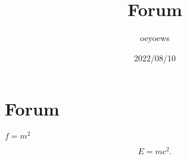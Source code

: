 \documentclass{article}
\title{Forum}
\author{oeyoews}
\date{2022/08/10}
\begin{document}
\maketitle

\section{Forum}%
\label{sec:Forum}

$f = m^2$

\[
E = mc^2
.\]
\end{document}

